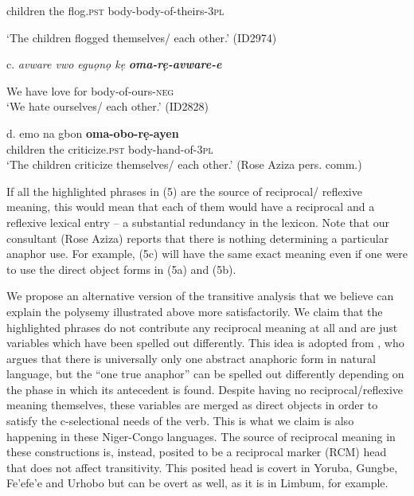 \documentclass[output=paper]{langsci/langscibook}
\begin{document}
\glt   children  the  flog.\textsc{pst}  body-body-of-theirs-\textsc{3pl}
\z

\glt   ‘The children flogged themselves/ each other.’ (ID2974)
\z

\glt c.  \textit{avware   vwo  eguọnọ   kẹ}   \textbf{\textit{oma-rẹ-avware-e}}   
\z

       We     have   love     for   body-of-ours-\textsc{neg}  \\
\glt   ‘We hate ourselves/ each other.’  (ID2828)
\z

\gll \textup{d.}  emo    na    gbon     \textbf{oma-obo-rẹ-ayen} \\
       children  the  criticize.\textsc{pst}   body-hand-of-\textsc{3pl}\\
\glt   ‘The children criticize themselves/ each other.’ (Rose Aziza pers. comm.)
\z

If all the highlighted phrases in (5) are the source of reciprocal/ reflexive meaning, this would mean that each of them would have a reciprocal and a reflexive lexical entry – a substantial redundancy in the lexicon. Note that our consultant (Rose Aziza) reports that there is nothing determining a particular anaphor use. For example, (5c) will have the same exact meaning even if one were to use the direct object forms in (5a) and (5b). 

  We propose an alternative version of the transitive analysis that we believe can explain the polysemy illustrated above more satisfactorily. We claim that the highlighted phrases do not contribute any reciprocal meaning at all and are just variables which have been spelled out differently. This idea is adopted from \citet{Safir2014}, who argues that there is universally only one abstract anaphoric form in natural language, but the “one true anaphor” can be spelled out differently depending on the phase in which its antecedent is found. Despite having no reciprocal/reflexive meaning themselves, these variables are merged as direct objects in order to satisfy the c-selectional needs of the verb. This is what we claim is also happening in these Niger-Congo languages. The source of reciprocal meaning in these constructions is, instead, posited to be a reciprocal marker (RCM) head that does not affect transitivity. This posited head is covert in Yoruba, Gungbe, Fe'efe'e and Urhobo but can be overt as well, as it is in Limbum, for example.


\ea\label{ex:}
\\
\ea\label{ex:}
 \\
\ea\label{ex:}
\\
\ea\label{ex:}
\\
\end{document}
